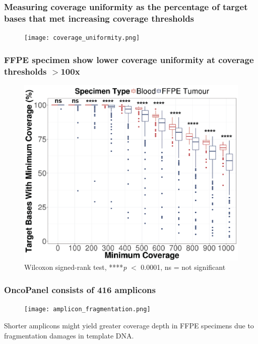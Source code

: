 \documentclass{beamer}
\begin{document}
\begin{frame}
\frametitle{Measuring coverage uniformity as the percentage of target bases that met increasing coverage thresholds}
\begin{figure}[t]
    \texttt{[image: coverage\_uniformity.png]}
\end{figure}
\end{frame}

\begin{frame}
\frametitle{FFPE specimen show lower coverage uniformity at coverage thresholds $>$100x}
\begin{figure}[t]
    \includegraphics[scale=0.48]{coverage_stats_defence.png}
    \caption{\scriptsize Wilcoxon signed-rank test, ****\textit{p} $<$ 0.0001, ns = not significant}
\end{figure}
\end{frame}

\begin{frame}
\frametitle{OncoPanel consists of 416 amplicons}
\begin{figure}[t]
    \texttt{[image: amplicon\_fragmentation.png]}
\end{figure}
Shorter amplicons might yield greater coverage depth in FFPE specimens due to fragmentation damages in template DNA.
\end{frame}
\end{document}
